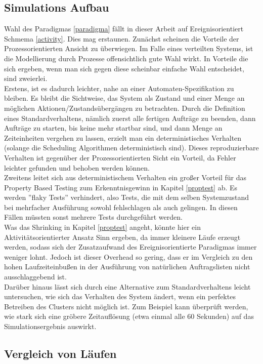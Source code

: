 \subsection{Simulations Aufbau}
Wahl des Paradigmas \ref{paradigma} fällt in dieser Arbeit auf Ereignisorientiert Schmema \ref{activity}. Dies mag erstaunen. Zunächst scheinen die Vorteile der Prozessorientierten Ansicht zu überwiegen. Im Falle eines verteilten Systems, ist die Modellierung durch Prozesse offensichtlich gute Wahl wirkt.
In Vorteile die sich ergeben, wenn man sich gegen diese scheinbar einfache Wahl entscheidet, sind zweierlei.\\ Erstens, ist es dadurch leichter, nahe an einer Automaten-Spezifikation zu bleiben. Es bleibt die Sichtweise, das System als Zustand und einer Menge an möglichen Aktionen/Zustandsübergängen zu betrachten. Durch die Definition eines Standardverhaltens, nämlich zuerst alle fertigen Aufträge zu beenden, dann Aufträge zu starten, bis keine mehr startbar sind, und dann Menge an Zeiteinheiten vergehen zu lassen, erzielt man ein deterministisches Verhalten (solange die Scheduling Algorithmen deterministisch sind). Dieses reproduzierbare Verhalten ist gegenüber der Prozessorientierten Sicht ein Vorteil, da Fehler leichter gefunden und behoben werden können.\\
Zweitens leitet sich aus deterministischem Verhalten ein großer Vorteil für das Property Based Testing zum Erkenntnisgewinn in Kapitel \ref{proptest} ab.
Es werden ''flaky Tests'' verhindert, also Tests, die mit dem selben Systemzustand bei mehrfacher Ausführung sowohl fehlschlagen als auch gelingen. In diesen Fällen müssten sonst mehrere Tests durchgeführt werden.\\
Was das Shrinking in Kapitel \ref{proptest} angeht, könnte hier ein  Aktivitätsorientierter Ansatz Sinn ergeben, da immer kleinere Läufe erzeugt werden, sodass sich der Zusatzaufwand des Ereignisorientierte Paradigmas immer weniger lohnt. Jedoch ist dieser Overhead so gering, dass er im Vergleich zu den hohen Laufzeiteinbußen in der Ausführung von natürlichen Auftragslisten nicht ausschlaggebend ist.\\
Darüber hinaus lässt sich durch eine Alternative zum Standardverhaltens leicht untersuchen, wie sich das Verhalten des System ändert, wenn ein perfektes Betreiben des Clusters nicht möglich ist. Zum Beispiel kann überprüft werden, wie stark sich eine gröbere Zeitauflösung (etwa einmal alle 60 Sekunden) auf das Simulationsergebnis auswirkt. 


\subsection{Vergleich von Läufen}
\label{vergleich}
